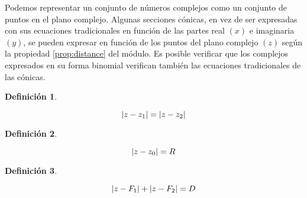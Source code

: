 \documentclass[a5paper,12pt,twoside]{book}
\newtheorem{defn}{{Definición}}[chapter]
\begin{document}
Podemos representar un conjunto de números complejos como un conjunto de puntos en el plano complejo. Algunas secciones cónicas, en vez de ser expresadas con sus ecuaciones tradicionales en función de las partes real $(x)$ e imaginaria $(y)$, se pueden expresar en función de los puntos del plano complejo $(z)$ según la propiedad \ref{prop:distance} del módulo. Es posible verificar que los complejos expresados en su forma binomial verifican también las ecuaciones tradicionales de las cónicas.

\begin{mdframed}[style=MyFrame1]
    \begin{defn}
    \end{defn}
    \begin{equation*}
        {\left| {z-z_1} \right|} = {\left| {z-z_2} \right|}
    \end{equation*}
\end{mdframed}

\begin{center}
    \def\svgwidth{0.6\linewidth}
    
\end{center}

\begin{mdframed}[style=MyFrame1]
    \begin{defn}
    \end{defn}
    \begin{equation*}
        {\left| {z-z_0} \right|} = R
    \end{equation*}
\end{mdframed}

\begin{center}
    \def\svgwidth{0.6\linewidth}
    
\end{center}

\begin{mdframed}[style=MyFrame1]
    \begin{defn}
    \end{defn}
    \begin{equation*}
        {\left| {z-F_1} \right|} + {\left| {z-F_2} \right|} = D
    \end{equation*}
\end{mdframed}
\end{document}
